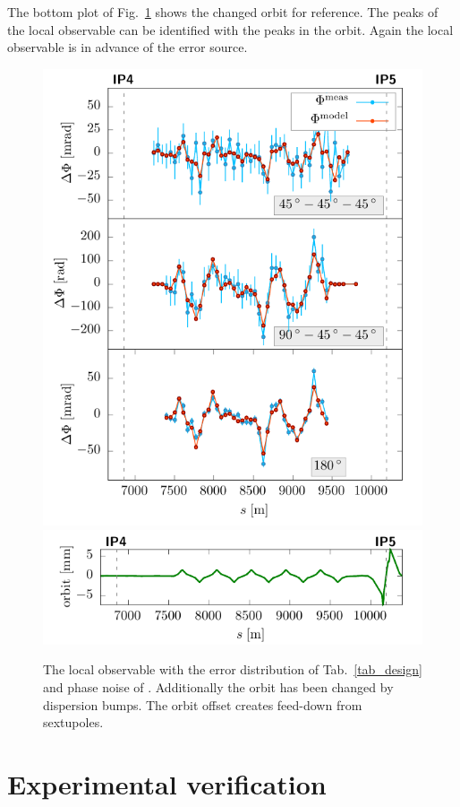 The bottom plot of Fig.~\ref{fig_disp_noise} shows the changed orbit for reference.
The peaks of the local observable can be identified with the peaks in the orbit.
Again the local observable is in 
advance of the error source.
%
\begin{figure}[t]
  \centering
  \includegraphics[width=.8\linewidth]{sim_disp}\\
  \includegraphics[width=.8\linewidth]{sim_orbit_x_noise_disp}
  \caption{The local observable with the error distribution of Tab.~\ref{tab_design} and phase noise
    of \noiserms. Additionally the orbit has been changed by dispersion bumps. The orbit offset creates
  feed-down from sextupoles.}
  \label{fig_disp_noise}
\end{figure}
%
\section{Experimental verification}
\label{sec:measurements}

